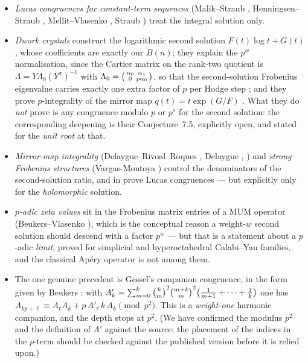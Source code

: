 \begin{itemize}[leftmargin=1.4em]
\item \emph{Lucas congruences for constant-term sequences} (Malik--Straub
  \cite{MalikStraub}, Henningsen--Straub \cite{HenningsenStraub}, Mellit--Vlasenko
  \cite{MellitVlasenko}, Straub \cite{Straub1401,Straub2301}) treat the integral solution
  only.
\item \emph{Dwork crystals} \cite{BVone,BVtwo,BVthree} construct the logarithmic second
  solution $F(t)\log t+G(t)$, whose coefficients are exactly our $B(n)$; they explain the
  $p^w$ normalisation, since the Cartier matrix on the rank-two quotient is
  $\Lambda=Y\Lambda_0(Y^\sigma)^{-1}$ with
  $\Lambda_0=\begin{psmallmatrix}\alpha_0&\alpha_1\\0&p\alpha_0\end{psmallmatrix}$, so
  that the second-solution Frobenius eigenvalue carries exactly one extra factor of $p$
  per Hodge step \cite[Prop.~7.7]{BVthree}; and they prove $p$-integrality of the mirror
  map $q(t)=t\exp(G/F)$ \cite[Cor.~7.11]{BVthree}. What they do \emph{not} prove is any
  congruence modulo $p$ or $p^s$ for the second solution: the corresponding deepening is
  their Conjecture~7.5, explicitly open, and stated for the \emph{unit root} at that.
\item \emph{Mirror-map integrality} (Delaygue--Rivoal--Roques \cite{DRR}, Delaygue
  \cite{Delaygue}, \cite{MirrorNote}) and \emph{strong Frobenius structures}
  (Vargas-Montoya \cite{VMcanon,VMmum}) control the denominators of the second-solution
  ratio, and in \cite{VMmum} prove Lucas congruences --- but explicitly only for the
  \emph{holomorphic} solution.
\item \emph{$p$-adic zeta values} sit in the Frobenius matrix entries of a MUM operator
  (Beukers--Vlasenko \cite{BVfrob}), which is the conceptual reason a weight-$w$ second
  solution should descend with a factor $p^w$ --- but that is a statement about a $p$-adic
  \emph{limit}, proved for simplicial and hyperoctahedral Calabi--Yau families, and the
  classical Ap\'ery operator is not among them.
\item The one genuine precedent is Gessel's companion congruence, in the form given by
  Beukers \cite[Thm.~1.4]{Beukers2211}: with
  $A'_k=\sum_{m=0}^k\binom{k}{m}^2\binom{m+k}{m}^2\bigl(\tfrac1{m+1}+\dots+\tfrac1k\bigr)$ one has
  $A_{kp+\ell}\equiv A_\ell A_k+p\,A'_\ell\,k\,A_k \pmod{p^2}$. This is a
  \emph{weight-one} harmonic companion, and the depth stops at $p^2$. (We have confirmed
  the modulus $p^2$ and the definition of $A'$ against the source; the placement of the
  indices in the $p$-term should be checked against the published version before it is
  relied upon.)
\end{itemize}

